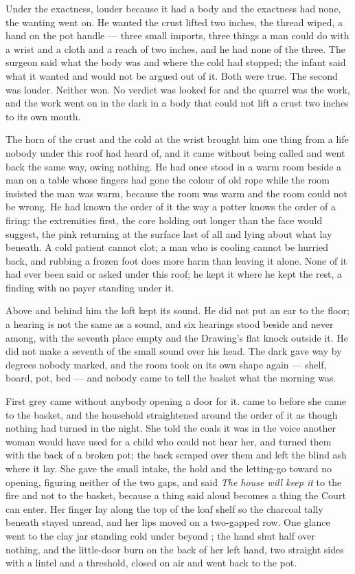Under the exactness, louder because it had a body and the exactness had none, the wanting went on. He wanted the crust lifted two inches, the thread wiped, a hand on the pot handle --- three small imports, three things a man could do with a wrist and a cloth and a reach of two inches, and he had none of the three. The surgeon said what the body was and where the cold had stopped; the infant said what it wanted and would not be argued out of it. Both were true. The second was louder. Neither won. No verdict was looked for and the quarrel was the work, and the work went on in the dark in a body that could not lift a crust two inches to its own mouth.

The horn of the crust and the cold at the wrist brought him one thing from a life nobody under this roof had heard of, and it came without being called and went back the same way, owing nothing. He had once stood in a warm room beside a man on a table whose fingers had gone the colour of old rope while the room insisted the man was warm, because the room was warm and the room could not be wrong. He had known the order of it the way a potter knows the order of a firing: the extremities first, the core holding out longer than the face would suggest, the pink returning at the surface last of all and lying about what lay beneath. A cold patient cannot clot; a man who is cooling cannot be hurried back, and rubbing a frozen foot does more harm than leaving it alone. None of it had ever been said or asked under this roof; he kept it where he kept the rest, a finding with no payer standing under it.

Above and behind him the loft kept its sound. He did not put an ear to the floor; a hearing is not the same as a sound, and six hearings stood beside and never among, with the seventh place empty and the Drawing's flat knock outside it. He did not make a seventh of the small sound over his head. The dark gave way by degrees nobody marked, and the room took on its own shape again --- shelf, board, pot, bed --- and nobody came to tell the basket what the morning was.

\scenebreak

First grey came without anybody opening a door for it.  came to  before she came to the basket, and the household straightened around the order of it as though nothing had turned in the night. She told the coals it was  in the voice another woman would have used for a child who could not hear her, and turned them with the back of a broken pot; the back scraped over them and left the blind ash where it lay. She gave the small intake, the hold and the letting-go toward no opening, figuring neither of the two gaps, and said \emph{The house will keep it} to the fire and not to the basket, because a thing said aloud becomes a thing the Court can enter. Her finger lay along the top of the loaf shelf so the charcoal tally beneath stayed unread, and her lips moved on a two-gapped row. One glance went to the clay jar standing cold under  beyond ; the hand shut half over nothing, and the little-door burn on the back of her left hand, two straight sides with a lintel and a threshold, closed on air and went back to the pot.

